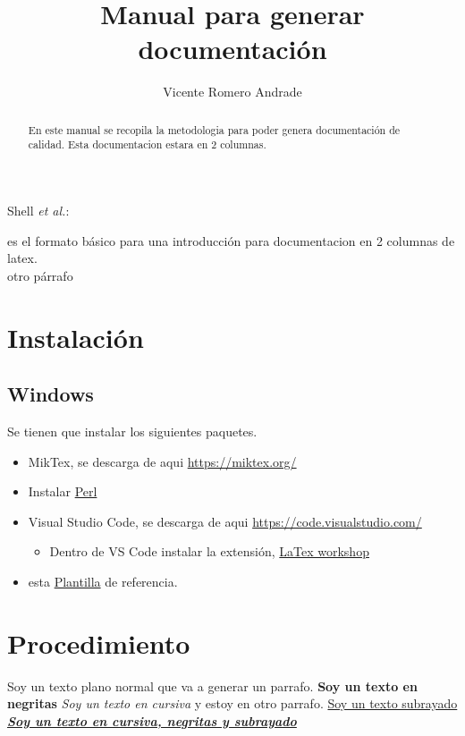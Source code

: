 \documentclass[journal]{IEEEtran}
\begin{document}
\title{Manual para generar documentación}
\author{Vicente Romero Andrade}
{Shell \MakeLowercase{\textit{et al.}}: }
\maketitle
\tableofcontents
\begin{abstract}
En este manual se recopila la metodologia para poder genera documentación de calidad.
Esta documentacion estara en 2 columnas.
\end{abstract}

\IEEEpeerreviewmaketitle


 es el formato básico para una 
introducción para documentacion en 2 columnas de latex.\\otro párrafo

\section{Instalación}
\subsection{Windows}
Se tienen que instalar los siguientes paquetes.
\begin{itemize}
    \item MikTex, se descarga de aqui \url{https://miktex.org/}
    \item Instalar \href{https://www.activestate.com/products/perl/downloads/}{Perl}
    \item Visual Studio Code, se descarga de aqui \url{https://code.visualstudio.com/}
    \begin{itemize}
        \item Dentro de VS Code instalar la extensión, \href{https://marketplace.visualstudio.com/items?itemName=James-Yu.latex-workshop}{LaTex workshop}
    \end{itemize}
    \item esta \href{https://github.com/ValdrST/Plantilla-LaTeX}{Plantilla} de referencia.
\end{itemize}

\section{Procedimiento}
Soy un texto plano normal que va a generar un parrafo. 
\textbf{Soy un texto en negritas}
\textit{Soy un texto en cursiva} y estoy en otro parrafo. \underline{Soy un texto subrayado}
\underline{\textit{\textbf{Soy un texto en cursiva, negritas y subrayado}}}  
\end{document}
